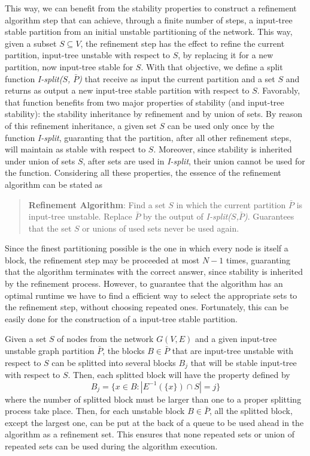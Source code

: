 \documentclass[12pt]{diazessay} %
\begin{document}
This way, we can benefit from the stability properties \cite{Tarjan1987} to construct a refinement algorithm step that can achieve, through a finite number of steps, a input-tree stable partition from an initial unstable partitioning of the network. This way, given a subset $S \subseteq V$, the refinement step has the effect to refine the current partition, input-tree unstable with respect to $S$, by replacing it for a new partition, now input-tree stable for $S$. With that objective, we define a split function \textit{I-split($S$, $\bar{P}$)} that receive as input the current partition and a set $S$ and returns as output a new input-tree stable partition with respect to $S$. Favorably, that function benefits from two major properties of stability (and input-tree stability): the stability inheritance by refinement and by union of sets. By reason of this refinement inheritance, a given set $S$ can be used only once by the function \textit{I-split}, guaranting that the partition, after all other refinement steps, will maintain as stable with respect to $S$. Moreover, since stability is inherited under union of sets $S$, after sets are used in \textit{I-split}, their union cannot be used for the function. Considering all these properties, the essence of the refinement algorithm can be stated as

\begin{quotation}
	\textbf{Refinement Algorithm}: Find a set $S$ in which the current partition $\bar{P}$ is input-tree unstable. Replace $\bar{P}$ by the output of \textit{I-split($S$,$\bar{P}$)}. Guarantees that the set $S$ or unions of used sets never be used again.
\end{quotation}

Since the finest partitioning possible is the one in which every node is itself a block, the refinement step may be proceeded at most $N-1$ times, guaranting that the algorithm terminates with the correct answer, since stability is inherited by the refinement process. However, to guarantee that the algorithm has an optimal runtime we have to find a efficient way to select the appropriate sets to the refinement step, without choosing repeated ones. Fortunately, this can be easily done for the construction of a input-tree stable partition.

Given a set $S$ of nodes from the network $G(V, E)$ and a given input-tree unstable graph partition $\bar{P}$, the blocks $B \in \bar{P}$ that are input-tree unstable with respect to $S$ can be splitted into several blocks $B_j$ that will be stable input-tree with respect to $S$. Then, each splitted block will have the property defined by
\begin{equation}
	B_j = \{ x \in B : | E^{-1}(\{x\}) \cap S | = j \}
\end{equation}
where the number of splitted block must be larger than one to a proper splitting process take place. Then, for each unstable block $B \in \bar{P}$, all the splitted block, except the largest one, can be put at the back of a queue to be used ahead in the algorithm as a refinement set. This ensures that none repeated sets or union of repeated sets can be used during the algorithm execution.
\end{document}
